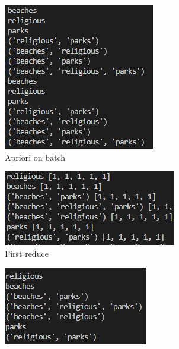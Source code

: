 \documentclass[a4paper]{article}
\begin{document}
\begin{figure}[h]
\begin{subfigure}[b]{0.24\textwidth}
		\end{subfigure}
		\hfill
		\begin{subfigure}[b]{0.24\textwidth}
			\centering
			\includegraphics[width=\textwidth]{Batch_fi.PNG}
         	\caption{Apriori on batch}
         	\label{fig:apriori}
		\end{subfigure}
		\hfill
		\begin{subfigure}[b]{0.24\textwidth}
			\centering
			\includegraphics[width=\textwidth]{grouped.PNG}
         	\caption{First reduce}
         	\label{fig:grouped}
		\end{subfigure}
		\hfill
		\begin{subfigure}[b]{0.24\textwidth}
			\centering
			\includegraphics[width=\textwidth]{candidates.PNG}

\end{subfigure}
\end{figure}
\end{document}

